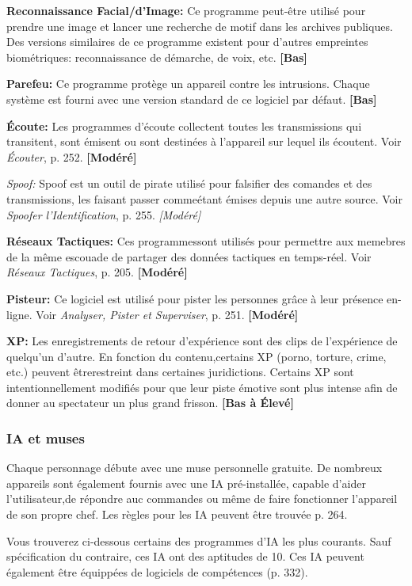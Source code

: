\textbf{Reconnaissance Facial/d'Image:} Ce programme peut-être utilisé pour prendre une image et lancer une recherche de motif dans les archives publiques. Des versions similaires de ce programme existent pour d'autres empreintes biométriques: reconnaissance de démarche, de voix, etc. \textbf{[Bas]} 

\textbf{Parefeu:} Ce programme protège un appareil contre les intrusions. Chaque système est fourni avec une version standard de ce logiciel par défaut. \textbf{[Bas]} 

\textbf{Écoute:} Les programmes d'écoute collectent toutes les transmissions qui transitent, sont émisent ou sont destinées à l'appareil sur lequel ils écoutent. Voir \emph{Écouter}, p. 252. \textbf{[Modéré]} 

\emph{Spoof:} Spoof est un outil de pirate utilisé pour falsifier des comandes et des transmissions, les faisant passer commeétant émises depuis une autre source. Voir \emph{Spoofer l'Identification}, p. 255. \emph{[Modéré]} 

\textbf{Réseaux Tactiques:} Ces programmessont utilisés pour permettre aux memebres de la même escouade de partager des données tactiques en temps-réel. Voir \emph{Réseaux Tactiques}, p. 205. \textbf{[Modéré]} 

\textbf{Pisteur:} Ce logiciel est utilisé pour pister les personnes grâce à leur présence en-ligne. Voir \emph{Analyser, Pister et Superviser}, p. 251. \textbf{[Modéré]} 

\textbf{XP:} Les enregistrements de retour d'expérience sont des clips de l'expérience de quelqu'un d'autre. En fonction du contenu,certains XP (porno, torture, crime, etc.) peuvent êtrerestreint dans certaines juridictions. Certains XP sont intentionnellement modifiés pour que leur piste émotive sont plus intense afin de donner au spectateur un plus grand frisson. \textbf{[Bas à Élevé]} 

\subsubsection{IA et muses} 

Chaque personnage débute avec une muse personnelle gratuite. De nombreux appareils sont également fournis avec une IA pré-installée, capable d'aider l'utilisateur,de répondre auc commandes ou même de faire fonctionner l'appareil de son propre chef. Les règles pour les IA peuvent être trouvée p. 264. 

Vous trouverez ci-dessous certains des programmes d'IA les plus courants. Sauf spécification du contraire, ces IA ont des aptitudes de 10. Ces IA peuvent également être équippées de logiciels de compétences (p. 332). 

